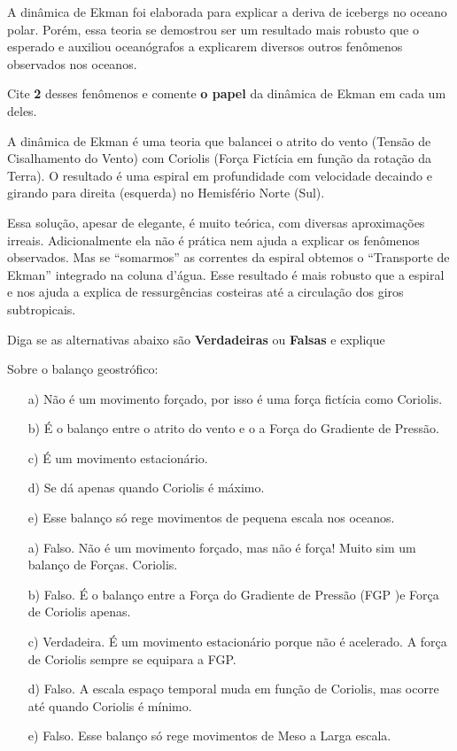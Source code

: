 \documentclass[letterpaper,portuguese,12pt,pdftex]{exam}
\begin{document}
\begin{questions}
\question[5]
A dinâmica de Ekman foi elaborada para explicar a deriva de icebergs no oceano
polar.  Porém, essa teoria se demostrou ser um resultado mais robusto que o
esperado e auxiliou oceanógrafos a explicarem diversos outros fenômenos
observados nos oceanos.

Cite {\bf 2} desses fenômenos e comente {\bf o papel} da dinâmica de Ekman em
cada um deles.

\begin{solution}
  A dinâmica de Ekman é uma teoria que balancei o atrito do vento (Tensão de
  Cisalhamento do Vento) com Coriolis (Força Fictícia em função da rotação da
  Terra).  O resultado é uma espiral em profundidade com velocidade decaindo e
  girando para direita (esquerda) no Hemisfério Norte (Sul).

  Essa solução, apesar de elegante, é muito teórica, com diversas aproximações
  irreais.  Adicionalmente ela não é prática nem ajuda a explicar os fenômenos
  observados.  Mas se ``somarmos'' as correntes da espiral obtemos o
  ``Transporte de Ekman'' integrado na coluna d'água.  Esse resultado é mais
  robusto  que a espiral e nos ajuda a explica de ressurgências costeiras até a
  circulação dos giros subtropicais.
\end{solution}

\question[5]
Diga se as alternativas abaixo são {\bf Verdadeiras} ou {\bf Falsas} e explique

Sobre o balanço geostrófico:

\begin{itemize}
  \item[a)] Não é um movimento forçado, por isso é uma força fictícia como
            Coriolis.
  \item[b)] É o balanço entre o atrito do vento e o a Força do Gradiente de
            Pressão.
  \item[c)] É um movimento estacionário.
  \item[d)] Se dá apenas quando Coriolis é máximo.
  \item[e)] Esse balanço só rege movimentos de pequena escala nos oceanos.
\end{itemize}


\begin{solution}
\begin{itemize}
  \item[a)] Falso. Não é um movimento forçado, mas não é força! Muito sim um
            balanço de Forças.
            Coriolis.
  \item[b)] Falso. É o balanço entre a Força do Gradiente de Pressão (FGP )e
            Força de Coriolis apenas.
  \item[c)] Verdadeira. É um movimento estacionário porque não é acelerado.  A
            força de Coriolis sempre se equipara a FGP.
  \item[d)] Falso.  A escala espaço temporal muda em função de Coriolis, mas
            ocorre até quando Coriolis é mínimo.
  \item[e)] Falso. Esse balanço só rege movimentos de Meso a Larga escala.
\end{itemize}
\end{solution}


\end{questions}
\end{document}
